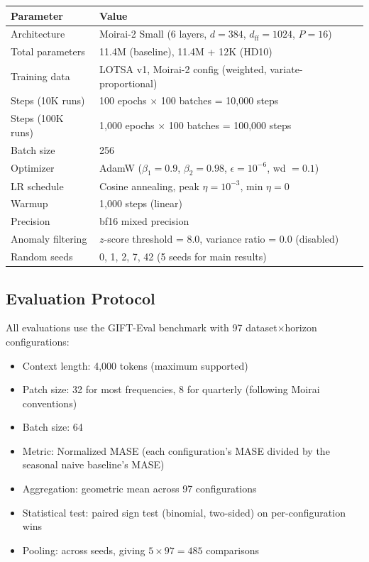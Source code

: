 \documentclass{article}
\begin{document}
\begin{center}
\small
\begin{tabular}{ll}
\toprule
\textbf{Parameter} & \textbf{Value} \\
\midrule
Architecture & Moirai-2 Small (6 layers, $d=384$, $d_{\text{ff}}=1024$, $P=16$) \\
Total parameters & 11.4M (baseline), 11.4M + 12K (HD10) \\
Training data & LOTSA v1, Moirai-2 config (weighted, variate-proportional) \\
Steps (10K runs) & 100 epochs $\times$ 100 batches = 10,000 steps \\
Steps (100K runs) & 1,000 epochs $\times$ 100 batches = 100,000 steps \\
Batch size & 256 \\
Optimizer & AdamW ($\beta_1=0.9$, $\beta_2=0.98$, $\epsilon=10^{-6}$, wd $=0.1$) \\
LR schedule & Cosine annealing, peak $\eta = 10^{-3}$, min $\eta = 0$ \\
Warmup & 1,000 steps (linear) \\
Precision & bf16 mixed precision \\
Anomaly filtering & $z$-score threshold = 8.0, variance ratio = 0.0 (disabled) \\
Random seeds & 0, 1, 2, 7, 42 (5 seeds for main results) \\
\bottomrule
\end{tabular}
\end{center}

\subsection{Evaluation Protocol}

All evaluations use the GIFT-Eval benchmark \citep{vijay2024gifteval} with 97 dataset$\times$horizon configurations:
\begin{itemize}
    \item Context length: 4,000 tokens (maximum supported)
    \item Patch size: 32 for most frequencies, 8 for quarterly (following Moirai conventions)
    \item Batch size: 64
    \item Metric: Normalized MASE (each configuration's MASE divided by the seasonal naive baseline's MASE)
    \item Aggregation: geometric mean across 97 configurations
    \item Statistical test: paired sign test (binomial, two-sided) on per-configuration wins
    \item Pooling: across seeds, giving $5 \times 97 = 485$ comparisons
\end{itemize}
\end{document}
